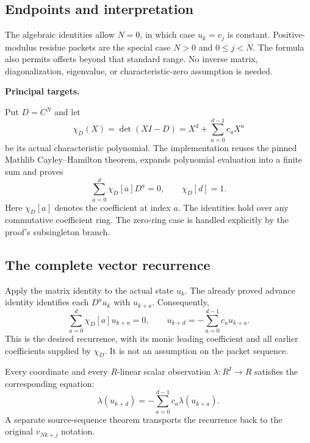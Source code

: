 \subsection*{Endpoints and interpretation}
The algebraic identities allow $N=0$, in which case $u_k=v_j$ is constant. Positive-modulus residue packets are the special case $N>0$ and $0\le j<N$. The formula also permits offsets beyond that standard range. No inverse matrix, diagonalization, eigenvalue, or characteristic-zero assumption is needed.

\textbf{Principal targets.}\par
{}\par
{}\par
{}\par
{}
\par\medskip
{}
Put $D=C^N$ and let
\[
 \chi_D(X)=\det(XI-D)=X^d+\sum_{a=0}^{d-1}c_aX^a
\]
be its actual characteristic polynomial. The implementation reuses the pinned Mathlib Cayley--Hamilton theorem, expands polynomial evaluation into a finite sum and proves
\[
 \sum_{a=0}^{d}\chi_D[a]D^a=0,
 \qquad \chi_D[d]=1.
\]
Here $\chi_D[a]$ denotes the coefficient at index $a$. The identities hold over any commutative coefficient ring. The zero-ring case is handled explicitly by the proof's subsingleton branch.

\subsection*{The complete vector recurrence}
Apply the matrix identity to the actual state $u_k$. The already proved advance identity identifies each $D^a u_k$ with $u_{k+a}$. Consequently,
\[
 \sum_{a=0}^{d}\chi_D[a]u_{k+a}=0,
 \qquad
 \boxed{u_{k+d}=-\sum_{a=0}^{d-1}c_a u_{k+a}.}
\]
This is the desired recurrence, with its monic leading coefficient and all earlier coefficients supplied by $\chi_D$. It is not an assumption on the packet sequence.

Every coordinate and every $R$-linear scalar observation $\lambda:R^I\to R$ satisfies the corresponding equation:
\[
 \lambda(u_{k+d})=-\sum_{a=0}^{d-1}c_a\lambda(u_{k+a}).
\]
A separate source-sequence theorem transports the recurrence back to the original $v_{Nk+j}$ notation.

